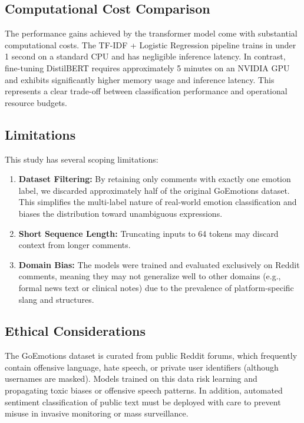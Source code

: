 \documentclass[
  conference,
  letterpaper]{IEEEtran}
\providecommand{\tightlist}{%
  \setlength{\itemsep}{0pt}\setlength{\parskip}{0pt}}
\begin{document}
\subsection{Computational Cost
Comparison}\label{computational-cost-comparison}

The performance gains achieved by the transformer model come with
substantial computational costs. The TF-IDF + Logistic Regression
pipeline trains in under 1 second on a standard CPU and has negligible
inference latency. In contrast, fine-tuning DistilBERT requires
approximately 5 minutes on an NVIDIA GPU and exhibits significantly
higher memory usage and inference latency. This represents a clear
trade-off between classification performance and operational resource
budgets.

\subsection{Limitations}\label{limitations}

This study has several scoping limitations:

\begin{enumerate}
\def\labelenumi{\arabic{enumi}.}
\tightlist
\item
  \textbf{Dataset Filtering:} By retaining only comments with exactly
  one emotion label, we discarded approximately half of the original
  GoEmotions dataset. This simplifies the multi-label nature of
  real-world emotion classification and biases the distribution toward
  unambiguous expressions.
\item
  \textbf{Short Sequence Length:} Truncating inputs to 64 tokens may
  discard context from longer comments.
\item
  \textbf{Domain Bias:} The models were trained and evaluated
  exclusively on Reddit comments, meaning they may not generalize well
  to other domains (e.g., formal news text or clinical notes) due to the
  prevalence of platform-specific slang and structures.
\end{enumerate}

\subsection{Ethical Considerations}\label{ethical-considerations}

The GoEmotions dataset is curated from public Reddit forums, which
frequently contain offensive language, hate speech, or private user
identifiers (although usernames are masked). Models trained on this data
risk learning and propagating toxic biases or offensive speech patterns.
In addition, automated sentiment classification of public text must be
deployed with care to prevent misuse in invasive monitoring or mass
surveillance.
\end{document}
